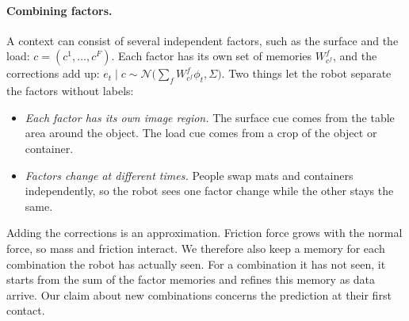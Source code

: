 \documentclass[10pt]{article}
\newcommand{\N}{\mathcal{N}}
\begin{document}
\paragraph{Combining factors.}
A context can consist of several independent factors, such as the surface and the load:
$c=(c^1,\dots,c^F)$. Each factor has its own set of memories $W^f_{c^f}$, and the corrections add up:
$e_t\mid c\sim\N\big(\sum_f W^f_{c^f}\phi_t,\Sigma\big)$. Two things let the robot separate the factors
without labels:
\begin{itemize}
  \item \emph{Each factor has its own image region.} The surface cue comes from the table area around
  the object. The load cue comes from a crop of the object or container.
  \item \emph{Factors change at different times.} People swap mats and containers independently, so
  the robot sees one factor change while the other stays the same.
\end{itemize}
Adding the corrections is an approximation. Friction force grows with the normal force, so mass and
friction interact. We therefore also keep a memory for each combination the robot has actually seen.
For a combination it has not seen, it starts from the sum of the factor memories and refines this
memory as data arrive. Our claim about new combinations concerns the prediction at their first
contact.
\end{document}
